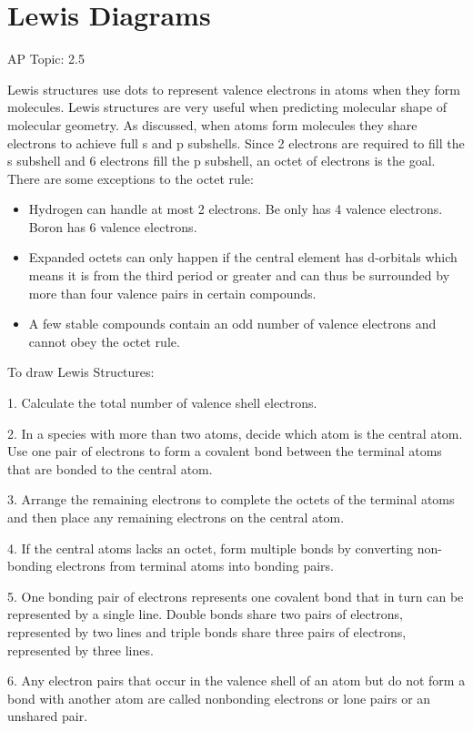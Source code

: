 \documentclass[../chem.tex]{subfiles}
\begin{document}
\section{Lewis Diagrams}
AP Topic: 2.5

Lewis structures use dots to represent valence electrons in atoms when they form molecules. Lewis structures are very useful when predicting 
molecular shape of molecular geometry. As discussed, when atoms form molecules they share electrons to achieve full s and p subshells. Since 2 electrons 
are required to fill the s subshell and 6 electrons fill the p subshell, an octet of electrons is the goal. There are some exceptions to the octet rule:
\begin{itemize}
    \item Hydrogen can handle at most 2 electrons. Be only has 4 valence electrons. Boron has 6 valence electrons. 
    \item Expanded octets can only happen if the central element has d-orbitals which means it is from the third period or greater and can thus be surrounded by more than four valence pairs in certain compounds. 
    \item A few stable compounds contain an odd number of valence electrons and cannot obey the octet rule.
\end{itemize}

To draw Lewis Structures:

1. Calculate the total number of valence shell electrons.

2. In a species with more than two atoms, decide which atom is the central atom. Use one pair of electrons to form a covalent bond between the 
terminal atoms that are bonded to the central atom.

3. Arrange the remaining electrons to complete the octets of the terminal atoms and then place any remaining electrons on the central atom.

4. If the central atoms lacks an octet, form multiple bonds by converting non-bonding electrons from terminal atoms into bonding pairs. 

5. One bonding pair of electrons represents one covalent bond that in turn can be represented by a single line. Double bonds share two pairs of electrons, 
represented by two lines and triple bonds share three pairs of electrons, represented by three lines.

6. Any electron pairs that occur in the valence shell of an atom but do not form a bond with another atom are called nonbonding electrons or lone pairs or an unshared pair.
\end{document}
